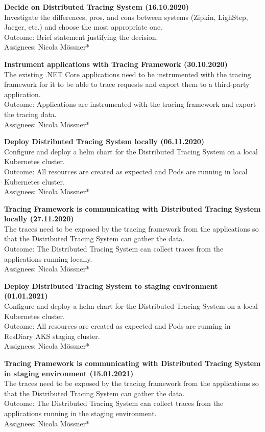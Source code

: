 \documentclass[11pt]{article}
\begin{document}
\textbf{Decide on Distributed Tracing System (16.10.2020)}\\
Investigate the differences, pros, and cons between systems (Zipkin, LighStep, Jaeger, etc.) and choose the most appropriate one.\\
Outcome: Brief statement justifying the decision.\\
Assignees: Nicola M\"{o}ssner*

\textbf{Instrument applications with Tracing Framework (30.10.2020)}\\
The existing .NET Core applications need to be instrumented with the tracing framework for it to be able to trace requests and export them to a third-party application.\\
Outcome: Applications are instrumented with the tracing framework and export the tracing data.\\
Assignees: Nicola M\"{o}ssner*

\textbf{Deploy Distributed Tracing System locally (06.11.2020)}\\
Configure and deploy a helm chart for the Distributed Tracing System on a local Kubernetes cluster.\\
Outcome: All resources are created as expected and Pods are running in local Kubernetes cluster.\\
Assignees: Nicola M\"{o}ssner*

\textbf{Tracing Framework is communicating with Distributed Tracing System locally (27.11.2020)}\\
The traces need to be exposed by the tracing framework from the applications so that the Distributed Tracing System can gather the data.\\
Outcome: The Distributed Tracing System can collect traces from the applications running locally.\\
Assignees: Nicola M\"{o}ssner*

\textbf{Deploy Distributed Tracing System to staging environment (01.01.2021)}\\
Configure and deploy a helm chart for the Distributed Tracing System on a local Kubernetes cluster.\\
Outcome: All resources are created as expected and Pods are running in ResDiary AKS staging cluster.\\
Assignees: Nicola M\"{o}ssner*

\textbf{Tracing Framework is communicating with Distributed Tracing System in staging environment (15.01.2021)}\\
The traces need to be exposed by the tracing framework from the applications so that the Distributed Tracing System can gather the data.\\
Outcome: The Distributed Tracing System can collect traces from the applications running in the staging environment.\\
Assignees: Nicola M\"{o}ssner*
\end{document}
